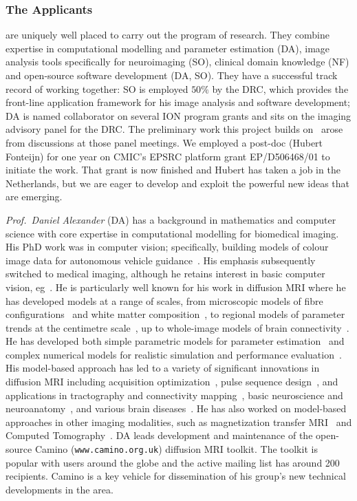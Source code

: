 \documentclass[a4paper,11pt]{article}
\begin{document}
\subsubsection*{The Applicants} are uniquely well placed to carry out
the program of research.  They combine expertise in computational
modelling and parameter estimation (DA), image analysis tools
specifically for neuroimaging (SO), clinical domain knowledge (NF) and
open-source software development (DA, SO).  They have a successful
track record of working together: SO is employed $50\%$ by the DRC,
which provides the front-line application framework for his image
analysis and software development; DA is named collaborator on several
ION program grants and sits on the imaging advisory panel for the DRC.
The preliminary work this project builds on~\cite{FonteijnScience11}
arose from discussions at those panel meetings.  We employed a
post-doc (Hubert Fonteijn) for one year on CMIC's EPSRC platform grant
EP/D506468/01 to initiate the work.  That grant is now finished and
Hubert has taken a job in the Netherlands, but we are eager to develop
and exploit the powerful new ideas that are emerging.

\emph{Prof.\ Daniel Alexander} (DA) has a background in mathematics
and computer science with core expertise in computational modelling
for biomedical imaging.  His PhD work was in computer vision;
specifically, building models of colour image data for autonomous
vehicle guidance~\cite{AlexanderIJCV01}. His emphasis subsequently
switched to medical imaging, although he retains interest in basic
computer vision, eg~\cite{SenanayakeBMVC07}. He is particularly well
known for his work in diffusion MRI where he has developed models at a
range of scales, from microscopic models of fibre
configurations~\cite{JansonsIP03,SeunarineBehrensBook09} and white
matter composition~\cite{AlexanderNI10,ZhangMICCAI10}, to regional
models of parameter trends at the centimetre
scale~\cite{MorganCDMRI10}, up to whole-image models of brain
connectivity~\cite{SherbondyMICCAI10}.  He has developed both simple
parametric models for parameter
estimation~\cite{JansonsIP03,AlexanderNI10} and complex numerical
models for realistic simulation and performance
evaluation~\cite{HallTMI09,PanagiotakiMICCAI10}.  His model-based
approach has led to a variety of significant innovations in diffusion
MRI including acquisition
optimization~\cite{AlexanderNI05,AlexanderMRM08}, pulse sequence
design~\cite{DrobnjakJMR10}, and applications in tractography and
connectivity
mapping~\cite{ParkerPTRS05}, basic
neuroscience and
neuroanatomy~\cite{JonesNI02,ParkerNI05,DraganskiJNeurosci08}, and
various brain diseases~\cite{NewtonBrain06,YogarajahBrain10}.  He has
also worked on model-based approaches in other imaging modalities,
such as magnetization transfer MRI~\cite{CercignaniMRM06} and Computed
Tomography~\cite{PrevostISBI10}.  DA leads development and maintenance
of the open-source Camino (\verb+www.camino.org.uk+) diffusion MRI
toolkit.  The toolkit is popular with users around the globe and the
active mailing list has around 200 recipients.  Camino is a key
vehicle for dissemination of his group's new technical developments in
the area.
\end{document}
